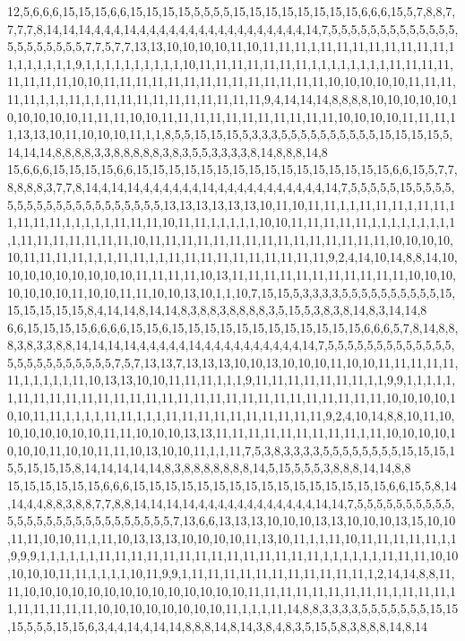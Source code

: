 12,5,6,6,6,15,15,15,6,6,15,15,15,15,5,5,5,5,15,15,15,15,15,15,15,15,6,6,6,15,5,7,8,8,7,7,7,7,8,14,14,14,4,4,4,14,4,4,4,4,4,4,4,4,4,4,4,4,4,4,4,4,4,14,7,5,5,5,5,5,5,5,5,5,5,5,5,5,5,5,5,5,5,5,5,5,7,7,5,7,7,13,13,10,10,10,10,11,10,11,11,11,1,11,11,11,11,11,11,11,11,11,1,1,1,1,1,1,9,1,1,1,1,1,1,1,1,1,1,10,11,11,11,11,11,11,11,1,1,1,1,1,1,1,1,11,11,11,11,11,11,11,11,10,10,11,11,11,11,11,11,11,11,11,11,11,11,11,11,10,10,10,10,10,11,11,11,11,11,1,1,1,11,1,1,11,11,11,11,11,11,11,11,11,11,9,4,14,14,14,8,8,8,8,10,10,10,10,10,10,10,10,10,10,11,11,11,10,10,11,11,11,11,11,11,11,11,11,11,11,10,10,10,10,11,11,11,11,13,13,10,11,10,10,10,11,1,1,8,5,5,15,15,15,5,3,3,3,5,5,5,5,5,5,5,5,5,5,15,15,15,15,5,14,14,14,8,8,8,8,3,3,8,8,8,8,8,3,8,3,5,5,3,3,3,3,8,14,8,8,8,14,8
15,6,6,6,15,15,15,15,6,6,15,15,15,15,15,15,15,15,15,15,15,15,15,15,15,15,6,6,15,5,7,7,8,8,8,8,3,7,7,8,14,4,14,14,4,4,4,4,4,4,14,4,4,4,4,4,4,4,4,4,4,4,14,7,5,5,5,5,5,15,5,5,5,5,5,5,5,5,5,5,5,5,5,5,5,5,5,5,5,5,13,13,13,13,13,13,10,11,10,11,11,1,1,11,11,11,1,11,11,11,11,11,11,1,1,1,1,1,11,11,11,10,11,11,1,1,1,1,1,10,10,11,11,11,11,11,1,1,1,1,1,1,1,1,1,1,11,11,11,11,11,11,11,10,11,11,11,11,11,11,11,11,11,11,11,11,11,11,11,10,10,10,10,10,11,11,11,11,1,1,1,11,11,1,1,11,11,11,11,11,11,11,11,11,11,9,2,4,14,10,14,8,8,14,10,10,10,10,10,10,10,10,10,11,11,11,11,10,13,11,11,11,11,11,11,11,11,11,11,11,10,10,10,10,10,10,10,11,10,10,11,11,10,10,13,10,1,1,10,7,15,15,5,3,3,3,3,5,5,5,5,5,5,5,5,5,5,15,15,15,15,15,15,8,4,14,14,8,14,14,8,3,8,8,3,8,8,8,8,3,5,15,5,3,8,3,8,14,8,3,14,14,8
6,6,15,15,15,15,6,6,6,6,15,15,6,15,15,15,15,15,15,15,15,15,15,15,15,6,6,6,5,7,8,14,8,8,8,3,8,3,3,8,8,14,14,14,14,4,4,4,4,4,14,4,4,4,4,4,4,4,4,4,4,14,7,5,5,5,5,5,5,5,5,5,5,5,5,5,5,5,5,5,5,5,5,5,5,5,5,7,5,7,13,13,7,13,13,13,10,10,13,10,10,10,11,10,10,11,11,11,11,11,11,1,1,1,1,1,11,10,13,13,10,10,11,11,11,1,1,1,9,11,11,11,11,11,11,11,1,1,9,9,1,1,1,1,1,1,11,11,11,11,11,11,11,11,11,11,11,11,11,11,11,11,11,11,11,11,11,11,11,10,10,10,10,10,10,11,11,1,1,1,1,11,11,1,1,1,11,11,11,11,11,11,11,11,11,11,9,2,4,10,14,8,8,10,11,10,10,10,10,10,10,10,11,11,10,10,10,13,13,11,11,11,11,11,11,11,11,11,1,11,10,10,10,10,10,10,10,11,10,10,11,11,10,13,10,10,11,1,1,11,7,5,3,8,3,3,3,3,5,5,5,5,5,5,5,5,15,15,15,15,5,15,15,15,8,14,14,14,14,14,8,3,8,8,8,8,8,8,8,14,5,15,5,5,5,3,8,8,8,14,14,8,8
15,15,15,15,15,15,6,6,6,15,15,15,15,15,15,15,15,15,15,15,15,15,15,15,15,6,6,15,5,8,14,14,4,4,8,8,3,8,8,7,7,8,8,14,14,14,14,4,4,4,4,4,4,4,4,4,4,4,4,14,14,7,5,5,5,5,5,5,5,5,5,5,5,5,5,5,5,5,5,5,5,5,5,5,5,5,5,5,5,7,13,6,6,13,13,13,10,10,10,13,13,10,10,10,13,15,10,10,11,11,10,10,11,1,11,10,13,13,13,10,10,10,10,11,13,10,11,1,1,11,10,11,11,11,11,11,1,1,9,9,9,1,1,1,1,1,1,11,11,11,11,11,11,11,11,11,11,11,11,11,11,1,1,1,1,1,1,11,11,11,10,10,10,10,10,11,11,1,1,1,1,10,11,9,9,1,11,11,11,11,11,11,11,11,11,11,11,1,2,14,14,8,8,11,11,10,10,10,10,10,10,10,10,10,10,10,10,10,10,11,11,11,11,11,11,11,11,11,1,11,11,11,11,11,11,11,11,11,10,10,10,10,10,10,10,10,11,1,1,1,11,14,8,8,3,3,3,3,5,5,5,5,5,5,5,15,15,15,5,5,5,15,15,6,3,4,4,14,4,14,14,8,8,8,14,8,14,3,8,4,8,3,5,15,5,8,3,8,8,8,14,8,14

